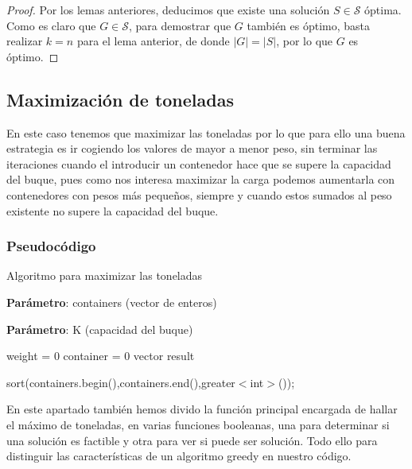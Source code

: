 \begin{proof}
    Por los lemas anteriores, deducimos que existe una solución $S \in \mathcal S$ óptima.
    Como es claro que $G \in \mathcal S$, para demostrar que $G$ también es óptimo, 
    basta realizar $k = n$ para el lema anterior, de donde $|G| = |S|$, por lo que
    $G$ es óptimo.
\end{proof}

\newpage

\subsection{Maximización de toneladas}
En este caso tenemos que maximizar las toneladas por lo que para ello una buena estrategia es ir cogiendo los valores 
de mayor a menor peso, sin terminar las iteraciones cuando el introducir un contenedor hace que se supere la capacidad del
buque, pues como nos interesa maximizar la carga podemos aumentarla con contenedores con pesos más pequeños, siempre y cuando 
estos sumados al peso existente no supere la capacidad del buque.

\subsubsection{Pseudocódigo}

\begin{algorithm}[H]
    \caption{Algoritmo para maximizar las toneladas}\label{alg:max_toneladas}
    \begin{minipage}{0.92\textwidth}

    \textbf{Parámetro}: containers (vector de enteros)

    \textbf{Parámetro}: K (capacidad del buque)

    \end{minipage}

    weight = 0\;
	container = 0\;
    vector result\;
  
    sort(containers.begin(),containers.end(),greater$<$int$>$());

  

\end{algorithm}

En este apartado también hemos divido la función principal encargada de hallar el máximo de toneladas, en varias funciones
booleanas, una para determinar si una solución es factible y otra para ver si puede ser solución. Todo ello para distinguir 
las características de un algoritmo greedy en nuestro código.

